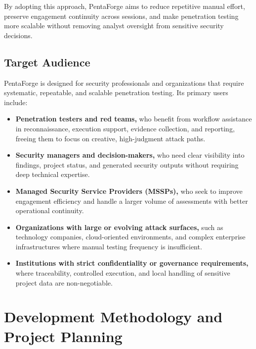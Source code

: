 \documentclass[12pt,a4paper]{report}
\begin{document}
By adopting this approach, PentaForge aims to reduce repetitive manual effort,
preserve engagement continuity across sessions, and make penetration testing more
scalable without removing analyst oversight from sensitive security decisions.

\subsection{Target Audience}

PentaForge is designed for security professionals and organizations that require
systematic, repeatable, and scalable penetration testing. Its primary users include:

\begin{itemize}
    \item \textbf{Penetration testers and red teams,} who benefit from workflow
    assistance in reconnaissance, execution support, evidence collection, and
    reporting, freeing them to focus on creative, high-judgment attack paths.

    \item \textbf{Security managers and decision-makers,} who need clear visibility
    into findings, project status, and generated security outputs without requiring
    deep technical expertise.

    \item \textbf{Managed Security Service Providers (MSSPs),} who seek to improve
    engagement efficiency and handle a larger volume of assessments with better
    operational continuity.

    \item \textbf{Organizations with large or evolving attack surfaces,} such as
    technology companies, cloud-oriented environments, and complex enterprise
    infrastructures where manual testing frequency is insufficient.

    \item \textbf{Institutions with strict confidentiality or governance
    requirements,} where traceability, controlled execution, and local handling
    of sensitive project data are non-negotiable.
\end{itemize}

\section{Development Methodology and Project Planning}
\end{document}
